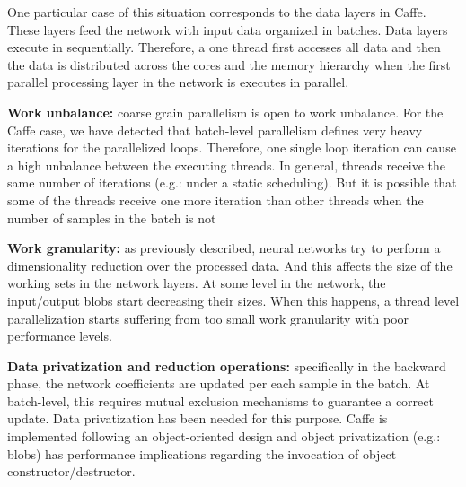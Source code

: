 One particular case of this situation corresponds to the data
layers in Caffe. These layers feed the network with input data
organized in batches. Data layers execute in sequentially.
Therefore, a one thread first accesses all data and then the data is
distributed across the cores and the memory hierarchy when the
first parallel processing layer in the network is executes in parallel. 

\textbf{Work unbalance:} coarse grain parallelism is open to work unbalance. 
For the Caffe case, we have detected that batch-level parallelism 
defines very heavy iterations for the parallelized loops.
Therefore, one single loop iteration can cause a high unbalance
between the executing threads. In general, threads receive the
same number of iterations (e.g.: under a static scheduling). But it
is possible that some of the threads receive one more iteration
than other threads when the number of samples in the batch is not

\textbf{Work granularity:} as previously described, neural networks try
to perform a dimensionality reduction over the processed data.
And this affects the size of the working sets in the network layers.
At some level in the network, the input/output blobs start decreasing their sizes. When this happens, a thread level parallelization
starts suffering from too small work granularity with poor performance levels.

\textbf{Data privatization and reduction operations:} specifically in the
backward phase, the network coefficients are updated per each
sample in the batch. At batch-level, this requires mutual exclusion
mechanisms to guarantee a correct update. Data privatization has
been needed for this purpose. Caffe is implemented following an
object-oriented design and object privatization (e.g.: blobs) has
performance implications regarding the invocation of object constructor/destructor.


